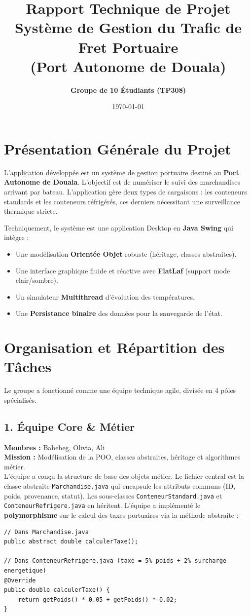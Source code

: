 \documentclass[11pt,a4paper]{article}
\title{\textbf{\Huge Rapport Technique de Projet}\\[0.5cm] \Large Système de Gestion du Trafic de Fret Portuaire \\ (Port Autonome de Douala)}
\author{\textbf{Groupe de 10 Étudiants (TP308)}}
\date{\today}
\begin{document}
\maketitle

\vspace{1cm}

\section*{Présentation Générale du Projet}
L'application développée est un système de gestion portuaire destiné au \textbf{Port Autonome de Douala}. L'objectif est de numériser le suivi des marchandises arrivant par bateau. L'application gère deux types de cargaisons : les conteneurs standards et les conteneurs réfrigérés, ces derniers nécessitant une surveillance thermique stricte. 

Techniquement, le système est une application Desktop en \textbf{Java Swing} qui intègre :
\begin{itemize}
    \item Une modélisation \textbf{Orientée Objet} robuste (héritage, classes abstraites).
    \item Une interface graphique fluide et réactive avec \textbf{FlatLaf} (support mode clair/sombre).
    \item Un simulateur \textbf{Multithread} d'évolution des températures.
    \item Une \textbf{Persistance binaire} des données pour la sauvegarde de l'état.
\end{itemize}

\newpage
\section{Organisation et Répartition des Tâches}

Le groupe a fonctionné comme une équipe technique agile, divisée en 4 pôles spécialisés.

\subsection{1. Équipe Core \& Métier}
\textbf{Membres :} Bahebeg, Olivia, Ali \\[0.2cm]
\textbf{Mission :} Modélisation de la POO, classes abstraites, héritage et algorithmes métier.\\[0.2cm]
L'équipe a conçu la structure de base des objets métier. Le fichier central est la classe abstraite \texttt{Marchandise.java} qui encapsule les attributs communs (ID, poids, provenance, statut). Les sous-classes \texttt{ConteneurStandard.java} et \texttt{ConteneurRefrigere.java} en héritent.
L'équipe a implémenté le \textbf{polymorphisme} sur le calcul des taxes portuaires via la méthode abstraite :
\begin{lstlisting}
// Dans Marchandise.java
public abstract double calculerTaxe();

// Dans ConteneurRefrigere.java (taxe = 5% poids + 2% surcharge energetique)
@Override
public double calculerTaxe() {
    return getPoids() * 0.05 + getPoids() * 0.02;
}
\end{lstlisting}
\end{document}
